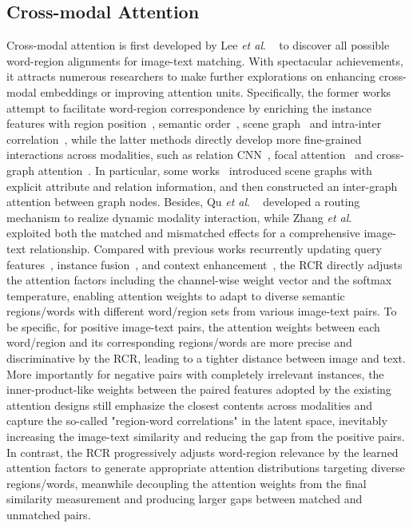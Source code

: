 \documentclass[journal]{IEEEtran}\newcommand{\ignore}[1]{}
\newcommand{\etal}{\textit{et al}. }
\begin{document}
\subsection{Cross-modal Attention}
Cross-modal attention is first developed by Lee \etal~\cite{SCAN} to discover all possible word-region alignments for image-text matching.
With spectacular achievements, it attracts numerous researchers to make further explorations on enhancing cross-modal embeddings or improving attention units. 
Specifically, the former works attempt to facilitate word-region correspondence by enriching the instance features with region position~\cite{PFAN}, semantic order~\cite{DP-RNN}, scene graph~\cite{HOAD,HAT} and intra-inter correlation~\cite{MMCA}, while the latter methods directly develop more fine-grained interactions across modalities, such as relation CNN~\cite{RDAN}, focal attention~\cite{BFAN} and cross-graph attention~\cite{HAT,GSMN}.
In particular, some works~\cite{HAT,HOAD,GSMN} introduced scene graphs with explicit attribute and relation information, and then constructed an inter-graph attention between graph nodes. Besides, Qu \etal~\cite{DIME} developed a routing mechanism to realize dynamic modality interaction, while Zhang \etal~\cite{NAAF} exploited both the matched and mismatched effects for a comprehensive image-text relationship.
Compared with previous works recurrently updating query features~\cite{IMRAM}, instance fusion~\cite{sm-LSTM,DAN}, and context enhancement~\cite{MMCA}, the RCR directly adjusts the attention factors including the channel-wise weight vector and the softmax temperature, enabling attention weights to adapt to diverse semantic regions/words with different word/region sets from various image-text pairs. To be specific, for positive image-text pairs, the attention weights between each word/region and its corresponding regions/words are more precise and discriminative by the RCR, leading to a tighter distance between image and text. More importantly for negative pairs with completely irrelevant instances, the inner-product-like weights between the paired features adopted by the existing attention designs still emphasize the closest contents across modalities and capture the so-called "region-word correlations" in the latent space, inevitably increasing the image-text similarity and reducing the gap from the positive pairs. In contrast, the RCR progressively adjusts word-region relevance by the learned attention factors to generate appropriate attention distributions targeting diverse regions/words, meanwhile decoupling the attention weights from the final similarity measurement and producing larger gaps between matched and unmatched pairs.
\end{document}
